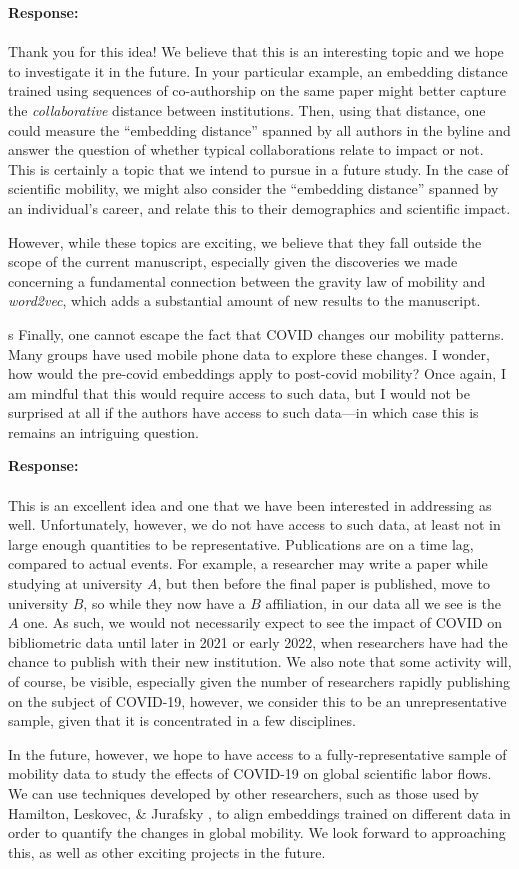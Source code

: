 \documentclass[12pt,a4paper]{article}
\newcounter{comment}[subsection]
\newcommand{\response}[1]{{\noindent \textbf{Response:} \\ \\ \noindent #1}}
\newcommand{\rcomment}[1]{%
\vspace{10pt}
\begin{sectionbox}
s #1
\end{sectionbox}
}
\begin{document}
\response{Thank you for this idea!
	We believe that this is an interesting topic and we hope to investigate it in the future.
	In your particular example, an embedding distance trained using sequences of co-authorship on the same paper might better capture the \textit{collaborative} distance between institutions.
	Then, using that distance, one could measure the ``embedding distance'' spanned by all authors in the byline and answer the question of whether typical collaborations relate to impact or not.
	This is certainly a topic that  we intend to pursue in a future study.
	In the case of scientific mobility, we might also consider the ``embedding distance'' spanned by an individual's career, and relate this to their demographics and scientific impact.

	However, while these topics are exciting, we believe that they fall outside the scope of the current manuscript, especially given the discoveries we made concerning a fundamental connection between the gravity law of mobility and \textit{word2vec}, which adds a substantial amount of new results to the manuscript.
}


\rcomment{
	Finally, one cannot escape the fact that COVID changes our mobility patterns. Many groups have used mobile phone data to explore these changes. I wonder, how would the pre-covid embeddings apply to post-covid mobility? Once again, I am mindful that this would require access to such data, but I would not be surprised at all if the authors have access to such data—in which case this is remains an intriguing question.
}

\response{This is an excellent idea and one that we have been interested in addressing as well.
	Unfortunately, however, we do not have access to such data, at least not in large enough quantities to be representative.
	Publications are on a time lag, compared to actual events.
	For example, a researcher may write a paper while studying at university $A$, but then before the final paper is published, move to university $B$, so while they now have a $B$ affiliation, in our data all we see is the $A$ one.
	As such, we would not necessarily expect to see the impact of COVID on bibliometric data until later in 2021 or early 2022, when researchers have had the chance to publish with their new institution.
	We also note that some activity will, of course, be visible, especially given the number of researchers rapidly publishing on the subject of COVID-19, however, we consider this to be an unrepresentative sample, given that it is concentrated in a few disciplines.

	In the future, however, we hope to have access to a fully-representative sample of mobility data to study the effects of COVID-19 on global scientific labor flows.
	We can use techniques developed by other researchers, such as those used by Hamilton, Leskovec, \& Jurafsky \autocite{hamilton-etal-2016-diachronic}, to align embeddings trained on different data in order to quantify the changes in global mobility.
	We look forward to approaching this, as well as other exciting projects in the future.
}
\end{document}
